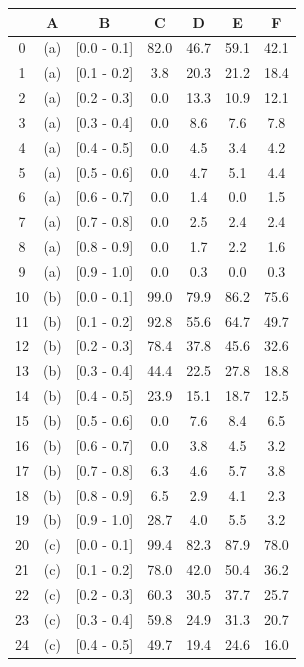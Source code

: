 \begin{table}[htbp]
\centering
\setlength\tabcolsep{2pt}
\begin{tabular}{|c|c|c|c|c|c|c|}
\hline
{} &    A &            B &    C &    D &    E &    F \\
\hline
0  &  (a) &  [0.0 - 0.1] & 82.0 & 46.7 & 59.1 & 42.1 \\
1  &  (a) &  [0.1 - 0.2] &  3.8 & 20.3 & 21.2 & 18.4 \\
2  &  (a) &  [0.2 - 0.3] &  0.0 & 13.3 & 10.9 & 12.1 \\
3  &  (a) &  [0.3 - 0.4] &  0.0 &  8.6 &  7.6 &  7.8 \\
4  &  (a) &  [0.4 - 0.5] &  0.0 &  4.5 &  3.4 &  4.2 \\
5  &  (a) &  [0.5 - 0.6] &  0.0 &  4.7 &  5.1 &  4.4 \\
6  &  (a) &  [0.6 - 0.7] &  0.0 &  1.4 &  0.0 &  1.5 \\
7  &  (a) &  [0.7 - 0.8] &  0.0 &  2.5 &  2.4 &  2.4 \\
8  &  (a) &  [0.8 - 0.9] &  0.0 &  1.7 &  2.2 &  1.6 \\
9  &  (a) &  [0.9 - 1.0] &  0.0 &  0.3 &  0.0 &  0.3 \\
10 &  (b) &  [0.0 - 0.1] & 99.0 & 79.9 & 86.2 & 75.6 \\
11 &  (b) &  [0.1 - 0.2] & 92.8 & 55.6 & 64.7 & 49.7 \\
12 &  (b) &  [0.2 - 0.3] & 78.4 & 37.8 & 45.6 & 32.6 \\
13 &  (b) &  [0.3 - 0.4] & 44.4 & 22.5 & 27.8 & 18.8 \\
14 &  (b) &  [0.4 - 0.5] & 23.9 & 15.1 & 18.7 & 12.5 \\
15 &  (b) &  [0.5 - 0.6] &  0.0 &  7.6 &  8.4 &  6.5 \\
16 &  (b) &  [0.6 - 0.7] &  0.0 &  3.8 &  4.5 &  3.2 \\
17 &  (b) &  [0.7 - 0.8] &  6.3 &  4.6 &  5.7 &  3.8 \\
18 &  (b) &  [0.8 - 0.9] &  6.5 &  2.9 &  4.1 &  2.3 \\
19 &  (b) &  [0.9 - 1.0] & 28.7 &  4.0 &  5.5 &  3.2 \\
20 &  (c) &  [0.0 - 0.1] & 99.4 & 82.3 & 87.9 & 78.0 \\
21 &  (c) &  [0.1 - 0.2] & 78.0 & 42.0 & 50.4 & 36.2 \\
22 &  (c) &  [0.2 - 0.3] & 60.3 & 30.5 & 37.7 & 25.7 \\
23 &  (c) &  [0.3 - 0.4] & 59.8 & 24.9 & 31.3 & 20.7 \\
24 &  (c) &  [0.4 - 0.5] & 49.7 & 19.4 & 24.6 & 16.0 \\

\end{tabular}
\end{table}
